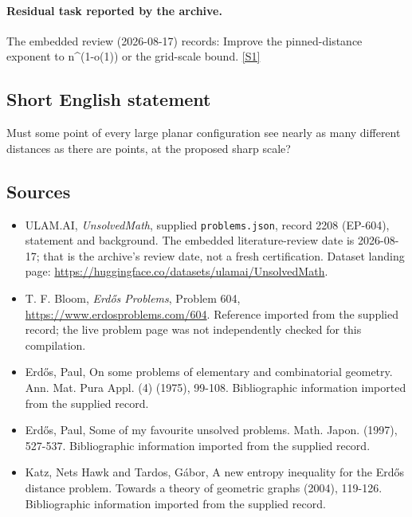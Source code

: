 \documentclass[11pt,a4paper]{article}
\newcommand{\sref}[2]{\hyperlink{source:#1:#2}{[S#2]}}
\begin{document}
\paragraph{Residual task reported by the archive.}

The embedded review (2026-08-17) records: Improve the pinned-distance exponent to n\textasciicircum{}(1-o(1)) or the grid-scale bound. \sref{2208}{1}

\subsection{Short English statement}

Must some point of every large planar configuration see nearly as many different distances as there are points, at the proposed sharp scale?

\subsection{Sources}

{\small

\begin{itemize}

\item[\hypertarget{source:2208:1}{S1}] ULAM.AI, \emph{UnsolvedMath}, supplied \texttt{problems.json}, record 2208 (EP-604), statement and background. The embedded literature-review date is 2026-08-17; that is the archive’s review date, not a fresh certification. Dataset landing page: \url{https://huggingface.co/datasets/ulamai/UnsolvedMath}.

\item[\hypertarget{source:2208:2}{S2}] T. F. Bloom, \emph{Erdős Problems}, Problem 604, \url{https://www.erdosproblems.com/604}. Reference imported from the supplied record; the live problem page was not independently checked for this compilation.

\item[\hypertarget{source:2208:3}{S3}] Erd\H{o}s, Paul, On some problems of elementary and combinatorial geometry. Ann. Mat. Pura Appl. (4) (1975), 99-108. Bibliographic information imported from the supplied record.

\item[\hypertarget{source:2208:4}{S4}] Erd\H{o}s, Paul, Some of my favourite unsolved problems. Math. Japon. (1997), 527-537. Bibliographic information imported from the supplied record.

\item[\hypertarget{source:2208:5}{S5}] Katz, Nets Hawk and Tardos, G\'{a}bor, A new entropy inequality for the Erd\H{o}s distance problem. Towards a theory of geometric graphs (2004), 119-126. Bibliographic information imported from the supplied record.

\end{itemize}

}

\label{end:2208}
\end{document}
